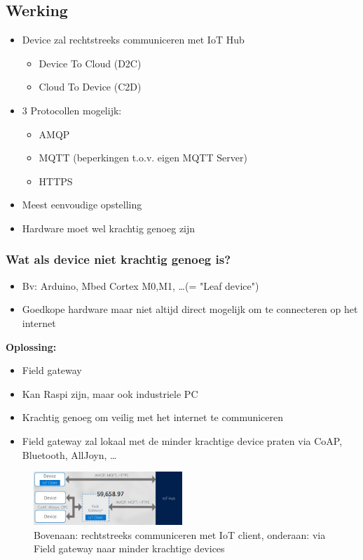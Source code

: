 \documentclass{article}
\newcommand{\bold}[1]{\textbf{#1}}
\begin{document}
\subsection{Werking}

\begin{itemize}
    \item Device zal rechtstreeks communiceren met IoT Hub
    \begin{itemize}
        \item Device To Cloud (D2C)
        \item Cloud To Device (C2D)
    \end{itemize}
    \item 3 Protocollen mogelijk:
    \begin{itemize}
        \item AMQP
        \item MQTT (beperkingen t.o.v. eigen MQTT Server)
        \item HTTPS
    \end{itemize}
    \item Meest eenvoudige opstelling
    \item Hardware moet wel krachtig genoeg zijn
\end{itemize}

\subsubsection{Wat als device niet krachtig genoeg is?}

\begin{itemize}
    \item Bv: Arduino, Mbed Cortex M0,M1, \dots (= "Leaf device")
    \item Goedkope hardware maar niet altijd direct mogelijk om te connecteren op het internet
\end{itemize}

\bold{Oplossing:}
\begin{itemize}
    \item Field gateway
    \item Kan Raspi zijn, maar ook industriele PC
    \item Krachtig genoeg om veilig met het internet te communiceren
    \item Field gateway zal lokaal met de minder krachtige device praten via CoAP, Bluetooth, AllJoyn, \dots
\end{itemize}

\begin{figure}[H]
    \centering
    \includegraphics[width=0.5\textwidth]{iot-hub.png}
    \caption{Bovenaan: rechtstreeks communiceren met IoT client, onderaan: via Field gateway naar minder krachtige devices}
\end{figure}
\end{document}
